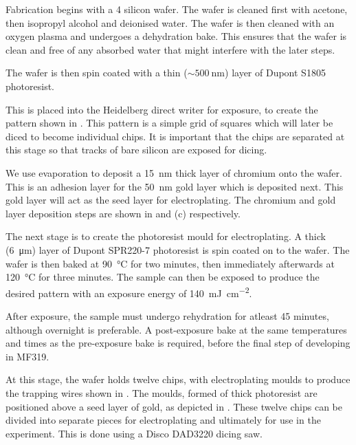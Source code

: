 {Fabrication begins with a \SI{4}{\inch} silicon wafer. The wafer is cleaned first
with acetone, then isopropyl alcohol and deionised water. The wafer is then
cleaned with an oxygen plasma and undergoes a dehydration bake.  This ensures
that the wafer is clean and free of any absorbed water that might
interfere with the later steps.

The wafer is then spin coated with a thin ($\sim\SI{500}{\nano\meter}$) layer
of Dupont S1805 photoresist. 

This is placed into the Heidelberg direct writer
for exposure, to create the pattern shown in . This pattern is a
simple grid of  squares which will later be diced to become
individual chips.  It is important that the chips are separated at this stage
so that tracks of bare silicon are exposed for dicing.
%

%
We use evaporation to deposit a \SI{15}{\nano\meter} thick layer of chromium onto the
wafer. This is an adhesion layer for the \SI{50}{\nano\meter} gold layer which is
deposited next. This gold layer will act as the seed layer for electroplating.
The chromium and gold layer deposition steps are shown in
 and (c) respectively.

The next stage is to create the photoresist mould for electroplating. A thick
(\SI{6}{\micro\meter}) layer of Dupont SPR220-7 photoresist is spin coated on to the
wafer. The wafer is then baked at \SI{90}{\celsius} for two minutes, then
immediately afterwards at \SI{120}{\celsius} for three minutes. The sample can
then be exposed to produce the desired pattern  with an exposure
energy of \SI{140}{\milli\joule\per\centi\meter\squared}.

After exposure, the sample must undergo rehydration for atleast 45 minutes,
although overnight is preferable. A post-exposure bake at the same temperatures
and times as the pre-exposure bake is required, before the final step of
developing in MF319.

At this stage, the wafer holds twelve chips, with electroplating moulds to
produce the trapping wires shown in . The moulds,
formed of thick photoresist are positioned above a seed layer of gold, as
depicted in . These twelve chips can be divided
into separate pieces for electroplating and ultimately for use in the
experiment. This is done using a Disco DAD3220 dicing saw.

}
